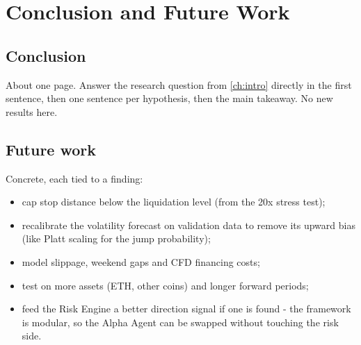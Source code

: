 \chapter{Conclusion and Future Work}\label{ch:conclusion}

\section{Conclusion}
\begin{guide}
About one page. Answer the research question from \cref{ch:intro} directly in the first sentence, then one sentence per hypothesis, then the main takeaway. No new results here.
\end{guide}
\tbc{}

\section{Future work}
\begin{guide}
Concrete, each tied to a finding:
\begin{itemize}
  \item cap stop distance below the liquidation level (from the 20x stress test);
  \item recalibrate the volatility forecast on validation data to remove its upward bias (like Platt scaling for the jump probability);
  \item model slippage, weekend gaps and CFD financing costs;
  \item test on more assets (ETH, other coins) and longer forward periods;
  \item feed the Risk Engine a better direction signal if one is found - the framework is modular, so the Alpha Agent can be swapped without touching the risk side.
\end{itemize}
\end{guide}
\tbc{}
